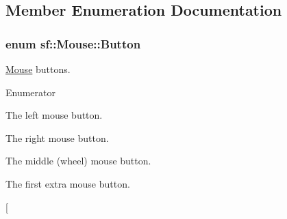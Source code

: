 \subsection{Member Enumeration Documentation}
\hypertarget{classsf_1_1_mouse_a4fb128be433f9aafe66bc0c605daaa90}{
\subsubsection[{Button}]{\setlength{\rightskip}{0pt plus 5cm}enum {\bf sf\+::\+Mouse\+::\+Button}}}\label{classsf_1_1_mouse_a4fb128be433f9aafe66bc0c605daaa90}


\hyperlink{classsf_1_1_mouse}{Mouse} buttons. 

\begin{Desc}
\item[Enumerator]\par
\begin{description}
\item[{\em 
\hypertarget{classsf_1_1_mouse_a4fb128be433f9aafe66bc0c605daaa90a8bb4856e1ec7f6b6a8605effdfc0eee8}{Left}\label{classsf_1_1_mouse_a4fb128be433f9aafe66bc0c605daaa90a8bb4856e1ec7f6b6a8605effdfc0eee8}
}]The left mouse button. \item[{\em 
\hypertarget{classsf_1_1_mouse_a4fb128be433f9aafe66bc0c605daaa90af2cff24ab6c26daf079b11189f982fc4}{Right}\label{classsf_1_1_mouse_a4fb128be433f9aafe66bc0c605daaa90af2cff24ab6c26daf079b11189f982fc4}
}]The right mouse button. \item[{\em 
\hypertarget{classsf_1_1_mouse_a4fb128be433f9aafe66bc0c605daaa90a2c353189c4b11cf216d7caddafcc609d}{Middle}\label{classsf_1_1_mouse_a4fb128be433f9aafe66bc0c605daaa90a2c353189c4b11cf216d7caddafcc609d}
}]The middle (wheel) mouse button. \item[{\em 
\hypertarget{classsf_1_1_mouse_a4fb128be433f9aafe66bc0c605daaa90aecc7f3ce9ad6a60b9b0027876446b8d7}{X\+Button1}\label{classsf_1_1_mouse_a4fb128be433f9aafe66bc0c605daaa90aecc7f3ce9ad6a60b9b0027876446b8d7}
}]The first extra mouse button. \item[{\em 
}
\end{description}
\end{Desc}
